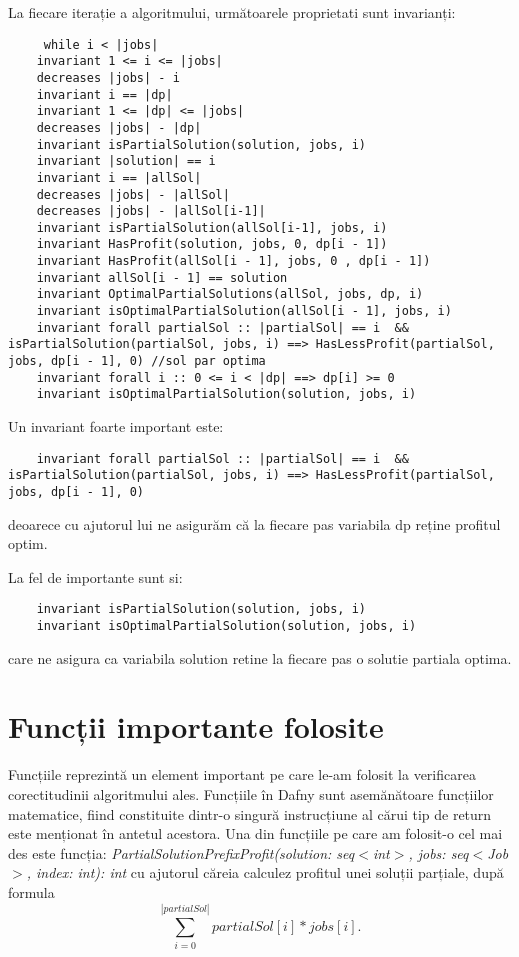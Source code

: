 La fiecare iterație a algoritmului, următoarele proprietati sunt invarianți:
\begin{lstlisting}
     while i < |jobs|
    invariant 1 <= i <= |jobs|
    decreases |jobs| - i
    invariant i == |dp|
    invariant 1 <= |dp| <= |jobs|
    decreases |jobs| - |dp|
    invariant isPartialSolution(solution, jobs, i) 
    invariant |solution| == i 
    invariant i == |allSol| 
    decreases |jobs| - |allSol|
    decreases |jobs| - |allSol[i-1]|
    invariant isPartialSolution(allSol[i-1], jobs, i)
    invariant HasProfit(solution, jobs, 0, dp[i - 1])
    invariant HasProfit(allSol[i - 1], jobs, 0 , dp[i - 1])
    invariant allSol[i - 1] == solution
    invariant OptimalPartialSolutions(allSol, jobs, dp, i)
    invariant isOptimalPartialSolution(allSol[i - 1], jobs, i)   
    invariant forall partialSol :: |partialSol| == i  && isPartialSolution(partialSol, jobs, i) ==> HasLessProfit(partialSol, jobs, dp[i - 1], 0) //sol par optima
    invariant forall i :: 0 <= i < |dp| ==> dp[i] >= 0
    invariant isOptimalPartialSolution(solution, jobs, i)
\end{lstlisting}
Un invariant foarte important este:
\begin{lstlisting}
    invariant forall partialSol :: |partialSol| == i  && isPartialSolution(partialSol, jobs, i) ==> HasLessProfit(partialSol, jobs, dp[i - 1], 0)
\end{lstlisting}
deoarece cu ajutorul lui ne asigurăm că la fiecare pas variabila dp reține profitul optim. 

La fel de importante sunt si:
\begin{lstlisting}
    invariant isPartialSolution(solution, jobs, i)
    invariant isOptimalPartialSolution(solution, jobs, i)
\end{lstlisting}
care ne asigura ca variabila solution retine la fiecare pas o solutie partiala optima. 

\section{Funcții importante folosite}
Funcțiile reprezintă un element important pe care le-am folosit la verificarea corectitudinii algoritmului ales. 
Funcțiile în Dafny sunt asemănătoare funcțiilor matematice, fiind constituite dintr-o singură instrucțiune al cărui tip de return este menționat în antetul acestora.
Una din funcțiile pe care am folosit-o cel mai des este funcția: \textit{PartialSolutionPrefixProfit(solution: seq$<$int$>$, jobs: seq$<$Job$>$, index: int): int} cu ajutorul căreia calculez profitul unei soluții parțiale, după formula \[ \sum_{i=0}^{|partialSol|} partialSol[i] * jobs[i]. \]


